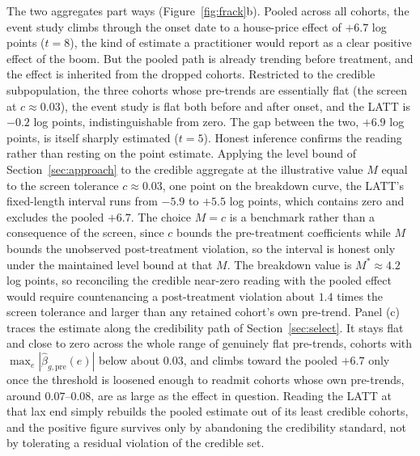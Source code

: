\documentclass[12pt]{article}
\theoremstyle{remark}
\begin{document}
The two aggregates part ways (Figure~\ref{fig:frack}b). Pooled across all cohorts, the event study
climbs through the onset date to a house-price effect of $+6.7$ log points ($t=8$), the kind of estimate
a practitioner would report as a clear positive effect of the boom. But the pooled path is already
trending before treatment, and the effect is inherited from the dropped cohorts. Restricted to the
credible subpopulation, the three cohorts whose pre-trends are essentially flat (the screen at
$c\approx0.03$), the event study is flat both before and after onset, and the LATT is $-0.2$ log points,
indistinguishable from zero. The gap between the two, $+6.9$ log points, is itself sharply
estimated ($t=5$). Honest inference confirms the reading rather than resting on the point estimate.
Applying the level bound of Section~\ref{sec:approach} to the credible aggregate at the illustrative value $M$
equal to the screen tolerance $c\approx0.03$, one point on the breakdown curve, the LATT's fixed-length
interval runs from $-5.9$ to $+5.5$ log points, which contains zero and excludes the pooled $+6.7$. The
choice $M=c$ is a benchmark rather than a consequence of the screen, since $c$ bounds the pre-treatment
coefficients while $M$ bounds the unobserved post-treatment violation, so the interval is honest only under
the maintained level bound at that $M$. The breakdown value is $M^\ast\approx4.2$ log points, so reconciling the credible near-zero
reading with the pooled effect would require countenancing a post-treatment violation about $1.4$ times the
screen tolerance and larger than any retained cohort's own pre-trend. Panel (c) traces
the estimate along the credibility path of Section~\ref{sec:select}. It stays flat and close to zero
across the whole range of genuinely flat pre-trends, cohorts with $\max_e|\hat\beta_{g,\mathrm{pre}}(e)|$
below about $0.03$, and climbs toward the pooled $+6.7$ only once the threshold is loosened enough to
readmit cohorts whose own pre-trends, around $0.07$--$0.08$, are as large as the effect in question.
Reading the LATT at that lax end simply rebuilds the pooled estimate out of its least credible cohorts,
and the positive figure survives only by abandoning the credibility standard, not by tolerating a
residual violation of the credible set.
\end{document}
